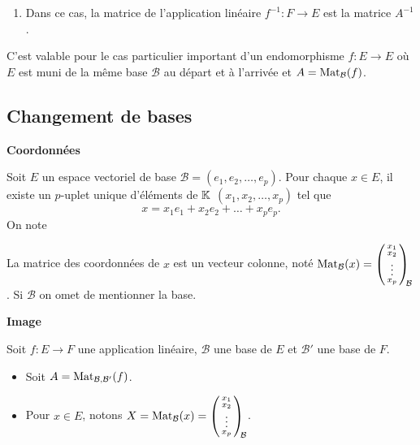 \documentclass[10pt,class=article,crop=false]{standalone}
\begin{document}
\begin{multicols}{2}
\begin{theoreme}
\begin{enumerate}
		\item Dans ce cas, la matrice de l'application linéaire
		$f^{-1} : F \to E$ est la matrice $A^{-1}$.
	\end{enumerate}
\end{theoreme}


C'est valable pour le cas particulier important d'un endomorphisme $f : E \to E$ où
$E$ est muni de la même base $\mathcal{B}$ au départ et à l'arrivée
et $A = \operatorname{Mat}_{\mathcal{B}}(f)$.
		



\subsection{Changement de bases}


\textbf{Coordonnées}

Soit $E$ un espace vectoriel de base $\mathcal{B} = (e_1,e_2, \dots ,e_p )$.
Pour chaque $x \in E$, il existe un $p$-uplet unique d'éléments de $\mathbb{K}$
$(x_1, x_2, \dots ,x_p)$ tel que
$$x=x_1e_1+x_2e_2+\dots +x_p e_p.$$
On note 

La matrice  des coordonnées de $x$ est un vecteur colonne, noté 
$\operatorname{Mat}_\mathcal{B} (x) = \left(\begin{smallmatrix}x_1\cr x_2\cr \vdots \cr x_p\end{smallmatrix}\right)_{\!\!\mathcal{B}}$.
Si $\mathcal{B}$ on omet de mentionner la base.


\textbf{Image}

Soit $f : E \to F$ une application linéaire, $\mathcal{B}$ une base de $E$ et
$\mathcal{B}'$ une base de $F$.
	\begin{itemize}
	\item Soit $A = \operatorname{Mat}_{\mathcal{B},\mathcal{B}'} (f)$.
	
	\item Pour $x \in E$, notons $X = \operatorname{Mat}_{\mathcal{B}} (x) =
	\left(\begin{smallmatrix}x_1\cr x_2\cr \vdots \cr x_p\end{smallmatrix}\right)_{\!\!\mathcal{B}}$.
	

\end{itemize}
\end{multicols}
\end{document}
